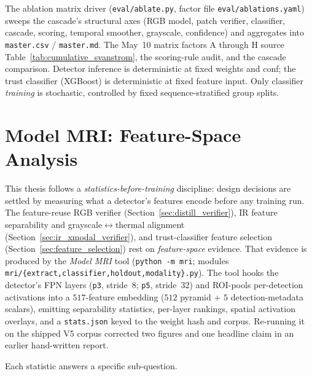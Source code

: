 The ablation matrix driver (\texttt{eval/ablate.py}, factor file \texttt{eval/ablations.yaml}) sweeps the cascade's structural axes (RGB model, patch verifier, classifier, cascade, scoring, temporal smoother, grayscale, confidence) and aggregates into \texttt{master.csv} / \texttt{master.md}. The May~10 matrix factors A through H source Table~\ref{tab:cumulative_svanstrom}, the scoring-rule audit, and the cascade comparison. Detector inference is deterministic at fixed weights and conf; the trust classifier (XGBoost) is deterministic at fixed feature input. Only classifier \emph{training} is stochastic, controlled by fixed sequence-stratified group splits.

\section{Model MRI: Feature-Space Analysis}
\label{sec:model_mri}

This thesis follows a \emph{statistics-before-training} discipline: design decisions are settled by measuring what a detector's features encode before any training run. The feature-reuse RGB verifier (Section~\ref{sec:distill_verifier}), IR feature separability and grayscale$\leftrightarrow$thermal alignment (Section~\ref{sec:ir_xmodal_verifier}), and trust-classifier feature selection (Section~\ref{sec:feature_selection}) rest on \emph{feature-space} evidence. That evidence is produced by the \emph{Model MRI} tool (\texttt{python -m mri}; modules \texttt{mri/\{extract,classifier,holdout,modality\}.py}). The tool hooks the detector's FPN layers (\texttt{p3}, stride~8; \texttt{p5}, stride~32) and ROI-pools per-detection activations into a $517$-feature embedding ($512$ pyramid + $5$ detection-metadata scalars), emitting separability statistics, per-layer rankings, spatial activation overlays, and a \texttt{stats.json} keyed to the weight hash and corpus. Re-running it on the shipped V5 corpus corrected two figures and one headline claim in an earlier hand-written report.

Each statistic answers a specific sub-question.

